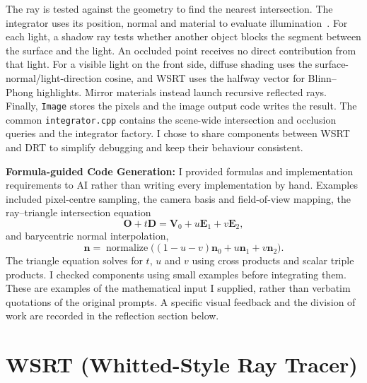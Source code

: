 \documentclass[11pt,a4paper]{article}
\begin{document}
The ray is tested against the geometry to find the nearest intersection. The integrator uses its position, normal and material to evaluate illumination~\cite{cgr-transcript}. For each light, a shadow ray tests whether another object blocks the segment between the surface and the light. An occluded point receives no direct contribution from that light. For a visible light on the front side, diffuse shading uses the surface-normal/light-direction cosine, and WSRT uses the halfway vector for Blinn--Phong highlights. Mirror materials instead launch recursive reflected rays. Finally, \texttt{Image} stores the pixels and the image output code writes the result. The common \texttt{integrator.cpp} contains the scene-wide intersection and occlusion queries and the integrator factory. I chose to share components between WSRT and DRT to simplify debugging and keep their behaviour consistent.

\textbf{Formula-guided Code Generation:} I provided formulas and implementation requirements to AI rather than writing every implementation by hand. Examples included pixel-centre sampling, the camera basis and field-of-view mapping, the ray--triangle intersection equation
\[
    \mathbf{O}+t\mathbf{D}
    =\mathbf{V}_0+u\mathbf{E}_1+v\mathbf{E}_2,
\]
and barycentric normal interpolation,
\[
    \mathbf{n}=\operatorname{normalize}
    \bigl((1-u-v)\mathbf{n}_0+u\mathbf{n}_1+v\mathbf{n}_2\bigr).
\]
The triangle equation solves for $t$, $u$ and $v$ using cross products and scalar triple products. I checked components using small examples before integrating them. These are examples of the mathematical input I supplied, rather than verbatim quotations of the original prompts. A specific visual feedback and the division of work are recorded in the reflection section below.

\section{WSRT (Whitted-Style Ray Tracer)}
\end{document}
